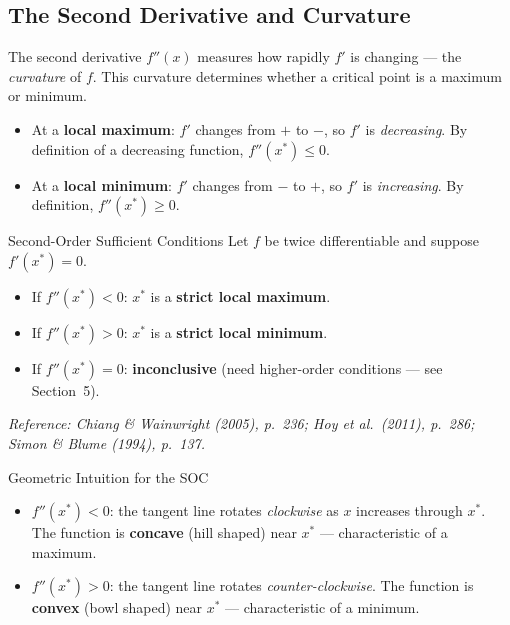 \documentclass[12pt, a4paper]{article}
\theoremstyle{definition}
\begin{document}
\subsection{The Second Derivative and Curvature}

The second derivative $f''(x)$ measures how rapidly $f'$ is changing ---
the \emph{curvature} of $f$.  This curvature determines whether a critical
point is a maximum or minimum.

\begin{itemize}
  \item At a \textbf{local maximum}: $f'$ changes from $+$ to $-$,
        so $f'$ is \emph{decreasing}.  By definition of a decreasing
        function, $f''(x^*) \leq 0$.
  \item At a \textbf{local minimum}: $f'$ changes from $-$ to $+$,
        so $f'$ is \emph{increasing}.  By definition, $f''(x^*) \geq 0$.
\end{itemize}

\begin{thmbox}{Second-Order Sufficient Conditions}
Let $f$ be twice differentiable and suppose $f'(x^*) = 0$.
\begin{itemize}
  \item If $f''(x^*) < 0$: \quad $x^*$ is a \textbf{strict local maximum}.
  \item If $f''(x^*) > 0$: \quad $x^*$ is a \textbf{strict local minimum}.
  \item If $f''(x^*) = 0$: \quad \textbf{inconclusive}
        (need higher-order conditions --- see Section~5).
\end{itemize}
\emph{Reference: Chiang \& Wainwright (2005), p.\ 236;
Hoy et al.\ (2011), p.\ 286; Simon \& Blume (1994), p.\ 137.}
\end{thmbox}

\begin{keybox}{Geometric Intuition for the SOC}
\begin{itemize}
  \item $f''(x^*) < 0$: the tangent line rotates \emph{clockwise} as $x$
        increases through $x^*$.  The function is \textbf{concave} (hill
        shaped) near $x^*$ --- characteristic of a maximum.
  \item $f''(x^*) > 0$: the tangent line rotates \emph{counter-clockwise}.
        The function is \textbf{convex} (bowl shaped) near $x^*$ ---
        characteristic of a minimum.
\end{itemize}
\end{keybox}
\end{document}

